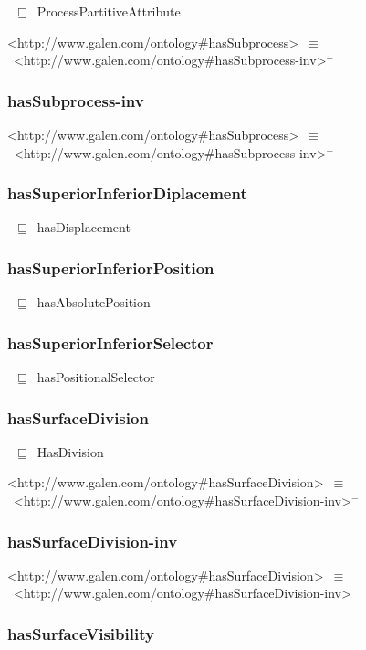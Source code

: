 \documentclass{article}
\begin{document}
~\ensuremath{\sqsubseteq}~ProcessPartitiveAttribute

<http://www.galen.com/ontology#hasSubprocess>~\ensuremath{\equiv}~<http://www.galen.com/ontology#hasSubprocess-inv>\ensuremath{^-}

\subsubsection*{hasSubprocess-inv}

<http://www.galen.com/ontology#hasSubprocess>~\ensuremath{\equiv}~<http://www.galen.com/ontology#hasSubprocess-inv>\ensuremath{^-}

\subsubsection*{hasSuperiorInferiorDiplacement}

~\ensuremath{\sqsubseteq}~hasDisplacement

\subsubsection*{hasSuperiorInferiorPosition}

~\ensuremath{\sqsubseteq}~hasAbsolutePosition

\subsubsection*{hasSuperiorInferiorSelector}

~\ensuremath{\sqsubseteq}~hasPositionalSelector

\subsubsection*{hasSurfaceDivision}

~\ensuremath{\sqsubseteq}~HasDivision

<http://www.galen.com/ontology#hasSurfaceDivision>~\ensuremath{\equiv}~<http://www.galen.com/ontology#hasSurfaceDivision-inv>\ensuremath{^-}

\subsubsection*{hasSurfaceDivision-inv}

<http://www.galen.com/ontology#hasSurfaceDivision>~\ensuremath{\equiv}~<http://www.galen.com/ontology#hasSurfaceDivision-inv>\ensuremath{^-}

\subsubsection*{hasSurfaceVisibility}
\end{document}
